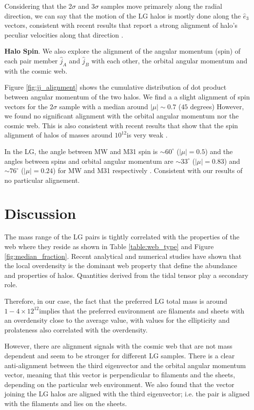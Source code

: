 \documentclass{emulateapj}
\newcommand{\Msun}{{\ifmmode{{\rm {M_{\odot}}}}\else{${\rm{M_{\odot}}}$}\fi}}
\begin{document}
Considering that the 2$\sigma$ and 3$\sigma$ samples move primarely
along the radial direction, we can say that the motion of the LG
halos is mostly done along the $\hat{e}_3$ vectors, consistent with
recent results that report a strong alignment of halo's peculiar
velocities along that direction \citep{ForeroRomero2014}.

{\bf Halo Spin}. We also explore the alignment of the  angular
momentum (spin) of each pair member $\hat{j}_A$ and $\hat{j}_B$ with
each other, the orbital angular momentum and with the cosmic web. 

Figure \ref{fig:jj_alignment} shows the cumulative distribution of dot
product between angular momentum of the  two halos. We find a a slight
alignment of spin vectors for the $2\sigma$ sample with a median around
$|\mu|\sim 0.7$ ($45$ degrees) However, we found no significant
alignment with the orbital angular momentum nor the cosmic web. This
is also consistent with recent results that show that the spin
alignment of halos of masses around $10^{12}$\Msun is very weak
\citep{ForeroRomero2014}. 
 
In the LG, the angle between MW and M31 spin is $\sim60^{\circ}$
($|\mu|=0.5$) and the angles between spins and orbital angular
momentum are $\sim33^{\circ}$ ($|\mu|=0.83$) and $\sim76^{\circ}$
($|\mu|=0.24$) for MW and M31 respectively
\citep{2012ApJ...753....9V}. Consistent with our results of no particular
alignement.

\section{Discussion}
\label{sec:discussion}

The mass range of the LG pairs is tightly correlated with the
properties of the web where they reside as shown in Table
\ref{table:web_type} and Figure \ref{fig:median_fraction}. Recent
analytical \citep{Alonso2014} and numerical studies \citep{Metuki2014}
have shown that the local overdensity is the dominant web property
that define the abundance and properties of halos. Quantities derived
from the tidal tensor play a secondary role. 

Therefore, in our case, the fact that the preferred LG total mass is
around $1-4\times 12^{12}$\Msun implies that the preferred environment
are filaments and sheets with an overdensity close to the average
value, with values for the ellipticity and prolateness also correlated
with the overdensity.

However, there are alignment signals with the cosmic web that are not
mass dependent and seem to be stronger for different LG samples. There
is a clear anti-alignment between the third eigenvector and the
orbital angular momentum vector, meaning that this vector is
perpendicular to filaments and the sheets, depending on the
particular web environment. We also found that the vector joining the
LG halos are aligned with the third eigenvector; i.e. the pair is
aligned with the filaments and lies on the sheets.
\end{document}
